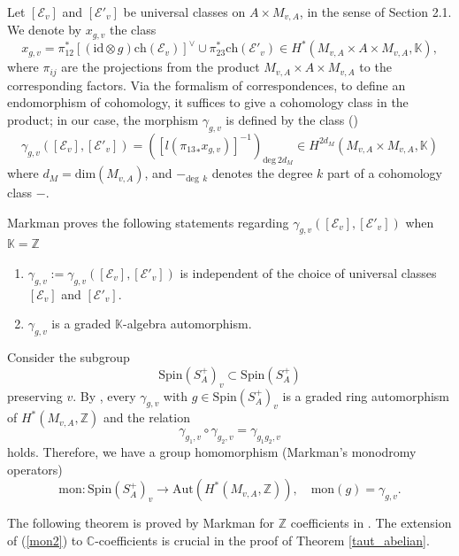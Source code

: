 \documentclass[11pt]{amsart}
\theoremstyle{plain}
\theoremstyle{definition}
\theoremstyle{remark}
\newcommand{\BC}{{\mathbb{C}}}
\newcommand{\BK}{{\mathbb{K}}}
\newcommand{\BZ}{{\mathbb{Z}}}
\newcommand{\CE}{{\mathcal E}}
\begin{document}
Let $[\CE_v]$ and $[\CE'_v]$ be universal classes on $A \times M_{v,A}$, in the sense of Section 2.1. We denote by $x_{g,v}$ the class  
\[
x_{g,v} =  \pi_{12}^\ast \left[(\mathrm{id}\otimes g)\mathrm{ch}(\CE_v)\right]^\vee \cup \pi_{23}^\ast \mathrm{ch}(\CE'_v) \in H^*(M_{v,A} \times A \times M_{v,A} ,\BK),
\]
where $\pi_{ij}$ are the projections from the product $M_{v,A}\times A \times M_{v,A}$ to the corresponding factors. 
Via the formalism of correspondences, to define an endomorphism of cohomology, it suffices to give a cohomology class in the product; in our case, 
the morphism $\gamma_{g,v}$ is defined by the class ()
\begin{equation}\label{gammagv}
 \gamma_{g,v}([\CE_v],[\CE'_v])=\left( \left[l({\pi_{13}}_\ast x_{g,v}) \right]^{-1} \right)_{\mathrm{deg}~2d_M} \in H^{2d_M}(M_{v,A} \times M_{v,A}, \BK)
\end{equation}
where $d_M = \mathrm{dim} (M_{v,A})$, and $-_{\mathrm{deg}~~ k}$ denotes the degree $k$ part of a cohomology class $-$.

Markman proves the following statements regarding $\gamma_{g,v}([\CE_v],[\CE'_v])$ when $\BK = \BZ$

\begin{enumerate}
\item[(a)] $\gamma_{g,v}:= \gamma_{g,v}([\CE_v],[\CE'_v])$ is independent of the choice of universal classes $[\CE_v]$ and $[\CE'_v]$.
\item[(b)] $\gamma_{g,v}$ is a graded $\BK$-algebra automorphism.
\end{enumerate}

Consider the subgroup 
\[
\mathrm{Spin}(S_A^+)_v \subset \mathrm{Spin}(S_A^+)
\]
preserving $v$. By \cite[Corollary 8.4]{Markman3}, every $\gamma_{g,v}$ with $g\in \mathrm{Spin}(S_A^+)_v$ is a graded ring automorphism of $H^\ast(M_{v,A}, \BZ)$ and the relation
\begin{equation}\label{composition}
\gamma_{g_1,v}\circ \gamma_{g_2,v} = \gamma_{g_1g_2,v}
\end{equation}
holds. Therefore, we have a group homomorphism (Markman's monodromy operators)
\begin{equation}\label{mon2}
    \mathrm{mon}:  \mathrm{Spin}(S_A^+)_v \to \mathrm{Aut}(H^*(M_{v,A}, \BZ)),\quad \mathrm{mon}(g) = \gamma_{g,v}.
\end{equation}


The following theorem is  proved by Markman for $\BZ$ coefficients in \cite{Markman2, Markman3}.
The extension of (\ref{mon2}) to  $\BC$-coefficients is crucial in the proof of Theorem \ref{taut_abelian}.
\end{document}
